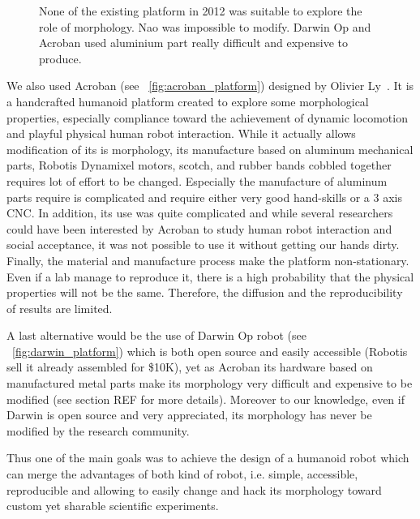 \begin{figure}[]
\centering
    \hfil
    \hfil
    \caption{None of the existing platform in 2012 was suitable to explore the role of morphology. Nao was impossible to modify. Darwin Op and Acroban used aluminium part really difficult and expensive to produce.}
    \label{fig:2012_Humanoids}
\end{figure}

We also used Acroban (see \figurename~\ref{fig:acroban_platform}) designed by Olivier Ly~\cite{Ly2010}. It is a handcrafted humanoid platform created to explore some morphological properties, especially compliance toward the achievement of dynamic locomotion and playful physical human robot interaction.
While it actually allows modification of its is morphology, its manufacture based on aluminum mechanical parts, Robotis Dynamixel motors, scotch, and rubber bands cobbled together requires lot of effort to be changed. Especially the manufacture of aluminum parts require is complicated and require either very good hand-skills or a 3 axis CNC.
In addition, its use was quite complicated and while several researchers could have been interested by Acroban to study human robot interaction and social acceptance, it was not possible to use it without getting our hands dirty.
Finally, the material and manufacture process make the platform non-stationary. Even if a lab manage to reproduce it, there is a high probability that the physical properties will not be the same. Therefore, the diffusion and the reproducibility of results are limited.


A last alternative would be the use of Darwin Op robot (see \figurename~\ref{fig:darwin_platform}) which is both open source and easily accessible (Robotis sell it already assembled for \$10K), yet as Acroban its hardware based on manufactured metal parts make its morphology very difficult and expensive to be modified (see section REF for more details). Moreover to our knowledge, even if Darwin is open source and very appreciated, its morphology has never be modified by the research community.

Thus one of the main goals was to achieve the design of a humanoid robot which can merge the advantages of both kind of robot, i.e. simple, accessible, reproducible and allowing to easily change and hack its morphology toward custom yet sharable scientific experiments.

